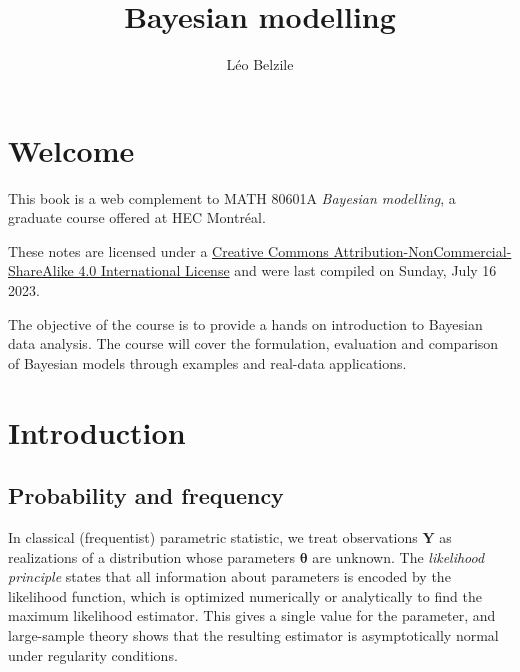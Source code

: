 \documentclass[
  11pt,
  letterpaper,
]{scrbook}
\title{Bayesian modelling}
\author{Léo Belzile}
\date{}
\renewcommand*\contentsname{Table of contents}
\newcommand\contentsname{Table of contents}
\theoremstyle{definition}
\theoremstyle{remark}
\begin{document}
\frontmatter
\maketitle
\ifdefined\Shaded\renewenvironment{Shaded}{\begin{tcolorbox}[frame hidden, interior hidden, sharp corners, enhanced, borderline west={3pt}{0pt}{shadecolor}, breakable, boxrule=0pt]}{\end{tcolorbox}}\fi

\renewcommand*\contentsname{Table of contents}
{
\setcounter{tocdepth}{2}
\tableofcontents
}
\mainmatter
{}

\hypertarget{welcome}{%
\chapter*{Welcome}\label{welcome}}


This book is a web complement to MATH 80601A \emph{Bayesian modelling},
a graduate course offered at HEC Montréal.

These notes are licensed under a
\href{http://creativecommons.org/licenses/by-nc-sa/4.0/}{Creative
Commons Attribution-NonCommercial-ShareAlike 4.0 International License}
and were last compiled on Sunday, July 16 2023.

The objective of the course is to provide a hands on introduction to
Bayesian data analysis. The course will cover the formulation,
evaluation and comparison of Bayesian models through examples and
real-data applications.


\hypertarget{introduction}{%
\chapter{Introduction}\label{introduction}}

\hypertarget{probability-and-frequency}{%
\section{Probability and frequency}\label{probability-and-frequency}}

In classical (frequentist) parametric statistic, we treat observations
\(\boldsymbol{Y}\) as realizations of a distribution whose parameters
\(\boldsymbol{\theta}\) are unknown. The \emph{likelihood principle}
states that all information about parameters is encoded by the
likelihood function, which is optimized numerically or analytically to
find the maximum likelihood estimator. This gives a single value for the
parameter, and large-sample theory shows that the resulting estimator is
asymptotically normal under regularity conditions.
\end{document}
